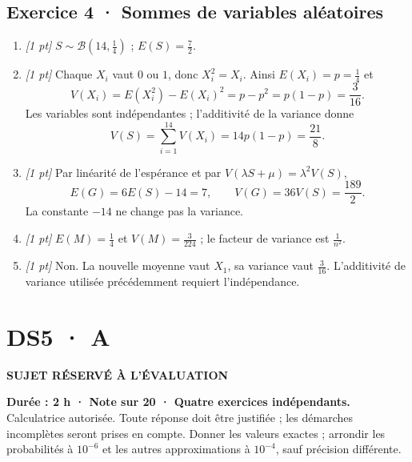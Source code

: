 \subsection*{Exercice 4 · Sommes de variables aléatoires}\begin{enumerate}

\item \textit{[1 pt]} $S\sim\mathcal B(14,\frac{1}{4})$ ; $E(S)=\frac{7}{2}$.

\item \textit{[1 pt]} Chaque $X_i$ vaut $0$ ou $1$, donc $X_i^2=X_i$. Ainsi $E(X_i)=p=\frac{1}{4}$ et
\[V(X_i)=E(X_i^2)-E(X_i)^2=p-p^2=p(1-p)=\frac{3}{16}.\]
Les variables sont indépendantes ; l'additivité de la variance donne
\[V(S)=\sum_{i=1}^{14}V(X_i)=14p(1-p)=\frac{21}{8}.\]

\item \textit{[1 pt]} Par linéarité de l'espérance et par $V(\lambda S+\mu)=\lambda^2V(S)$,
\[E(G)=6E(S)-14=7,\qquad V(G)=36V(S)=\frac{189}{2}.\]
La constante $-14$ ne change pas la variance.

\item \textit{[1 pt]} $E(M)=\frac{1}{4}$ et $V(M)=\frac{3}{224}$ ; le facteur de variance est $\frac{1}{n^2}$.

\item \textit{[1 pt]} Non. La nouvelle moyenne vaut $X_1$, sa variance vaut $\frac{3}{16}$. L'additivité de variance utilisée précédemment requiert l'indépendance.

\end{enumerate}

\fi

\ifprof

\clearpage{}\label{sujet:7-3}

\section*{DS5 · A}

{\sffamily\bfseries\color{amber}SUJET RÉSERVÉ À L'ÉVALUATION\par}

\textbf{Durée : 2 h · Note sur 20 · Quatre exercices indépendants.}\\Calculatrice autorisée. Toute réponse doit être justifiée ; les démarches incomplètes seront prises en compte. Donner les valeurs exactes ; arrondir les probabilités à $10^{-6}$ et les autres approximations à $10^{-4}$, sauf précision différente.

